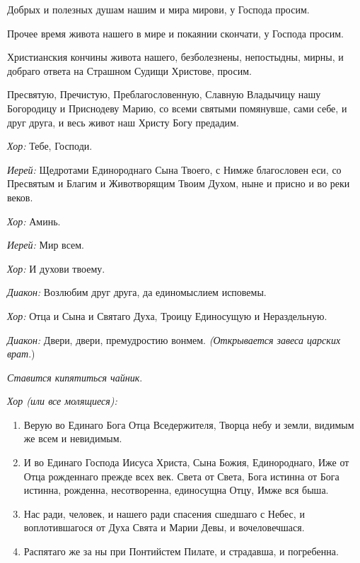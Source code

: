 \begin{mymulticols}
  Добрых и полезных душам нашим и мира мирови, у Господа просим. 


  Прочее время живота нашего в мире и покаянии скончати, у Господа просим. 


  Христианския кончины живота нашего, безболезнены, непостыдны, мирны, и добраго ответа на Страшном Судищи Христове, просим. 


  Пресвятую, Пречистую, Преблагословенную, Славную Владычицу нашу Богородицу и Приснодеву Марию, со всеми святыми помянувше, сами себе, и друг друга, и весь живот наш Христу Богу предадим.


{\itshape Хор:} Тебе, Господи.


{\itshape Иерей:} Щедротами Единороднаго Сына Твоего, с Нимже благословен еси, со Пресвятым и Благим и Животворящим Твоим Духом, ныне и присно и во реки веков.


{\itshape Хор:} Аминь.

 {\itshape Иерей:} Мир всем.

 {\itshape Хор:} И духови твоему.

 {\itshape Диакон:} Возлюбим друг друга, да единомыслием исповемы.

{\itshape Хор:} Отца и Сына и Святаго Духа, Троицу Единосущую и Нераздельную.

 {\itshape Диакон:} Двери, двери, премудростию вонмем.  {\itshape (Открывается завеса царских врат}.)

 


 {\itshape Ставится кипятиться чайник}. 




{\itshape Хор (или все молящиеся):}

\begin{enumerate}

\item Верую во Единаго Бога Отца Вседержителя, Творца небу и земли, видимым же всем и невидимым. 


\item И во Единаго Господа Иисуса Христа, Сына Божия, Единороднаго, Иже от Отца рожденнаго прежде всех век. Света от Света, Бога истинна от Бога истинна, рожденна, несотворенна, единосущна Отцу, Имже вся быша.


\item Нас ради, человек, и нашего ради спасения сшедшаго с Небес, и воплотившагося от Духа Свята и Марии Девы, и вочеловечшася.


\item Распятаго же за ны при Понтийстем Пилате, и страдавша, и погребенна.



\end{enumerate}
\end{mymulticols}

